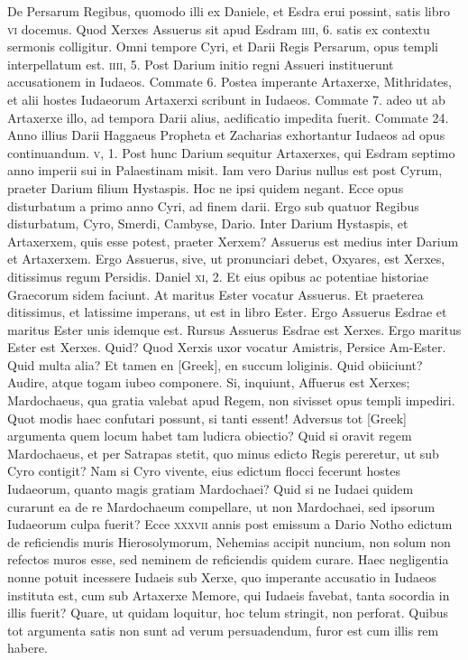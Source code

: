 De Persarum Regibus, quomodo illi ex Daniele,
 et Esdra erui possint,
satis libro \textsc{vi} docemus.
Quod Xerxes Assuerus sit apud Esdram
\textsc{iiii}, 6. satis ex contextu sermonis colligitur.
Omni tempore
Cyri, et Darii Regis Persarum, opus templi interpellatum est.
\textsc{iiii}, 5.
Post Darium initio regni Assueri instituerunt accusationem
in Iudaeos.
Commate 6.
Postea imperante Artaxerxe, Mithridates,
et alii hostes Iudaeorum Artaxerxi scribunt in Iudaeos.
Commate 7.
adeo ut ab Artaxerxe illo, ad tempora Darii alius, aedificatio impedita
fuerit.
Commate 24.
Anno illius Darii Haggaeus Propheta
et Zacharias exhortantur Iudaeos ad opus continuandum.
\textsc{v}, 1.
Post hunc Darium sequitur Artaxerxes, qui Esdram septimo anno
imperii sui in Palaestinam misit.
Iam vero Darius nullus est post Cyrum,
praeter Darium filium Hystaspis.
Hoc ne ipsi quidem negant.
Ecce opus disturbatum a primo anno Cyri, ad finem darii.
Ergo sub quatuor Regibus disturbatum, Cyro, Smerdi, Cambyse,
Dario.
Inter Darium Hystaspis, et Artaxerxem, quis esse potest,
praeter Xerxem?
Assuerus est medius inter Darium et Artaxerxem.
Ergo Assuerus, sive, ut pronunciari debet, Oxyares,
 est Xerxes, ditissimus
regum Persidis.
Daniel \textsc{xi}, 2.
Et eius opibus ac potentiae historiae
Graecorum sidem faciunt.
At maritus Ester vocatur Assuerus.
Et praeterea ditissimus, et latissime imperans, ut est in libro
Ester.
Ergo Assuerus Esdrae et maritus Ester unis idemque est.
Rursus Assuerus Esdrae est Xerxes.
Ergo maritus Ester est Xerxes.
Quid?
Quod Xerxis uxor vocatur Amistris, Persice Am-Ester.
Quid multa alia?
Et tamen en \textgreek{[Greek]}, en succum loliginis.
Quid obiiciunt?
Audire, atque togam iubeo componere.
Si, inquiunt, Affuerus est Xerxes;
Mardochaeus, qua gratia valebat apud Regem, non sivisset opus
templi impediri.
Quot modis haec confutari possunt, si tanti essent!
Adversus tot \textgreek{[Greek]} argumenta quem locum
 habet tam ludicra obiectio?
Quid si oravit regem Mardochaeus, et per Satrapas stetit, quo
minus edicto Regis pereretur, ut sub Cyro contigit?
Nam si Cyro vivente,
eius edictum flocci fecerunt hostes Iudaeorum, quanto magis
gratiam Mardochaei?
Quid si ne Iudaei quidem curarunt ea de re Mardochaeum
compellare, ut non Mardochaei, sed ipsorum Iudaeorum
culpa fuerit?
Ecce \textsc{xxxvii} annis post emissum a Dario Notho edictum
de reficiendis muris Hierosolymorum, Nehemias accipit nuncium,
non solum non refectos muros esse, sed neminem de reficiendis
quidem curare.
Haec negligentia nonne potuit incessere Iudaeis sub
Xerxe, quo imperante accusatio in Iudaeos instituta est, cum sub Artaxerxe
Memore, qui Iudaeis favebat, tanta socordia in illis fuerit?
Quare, ut quidam loquitur, hoc telum stringit, non perforat.
Quibus tot argumenta satis non sunt ad verum persuadendum, furor est
cum illis rem habere.

